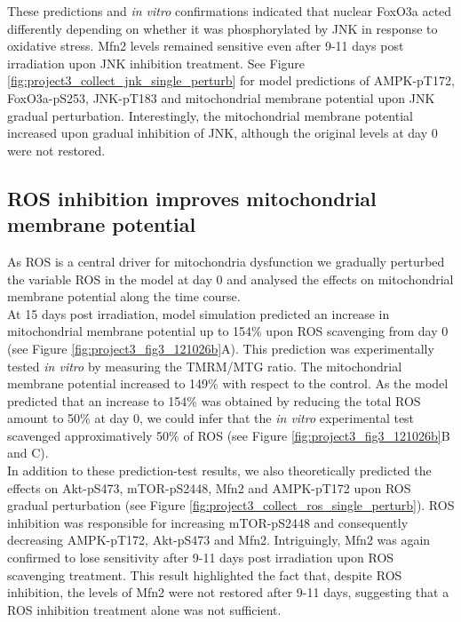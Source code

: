 These predictions and \emph{in vitro} confirmations indicated that nuclear FoxO3a acted differently depending on whether it was phosphorylated by JNK in response to oxidative stress. Mfn2 levels remained sensitive even after 9-11 days post irradiation upon JNK inhibition treatment. See Figure \ref{fig:project3_collect_jnk_single_perturb} for model predictions of AMPK-pT172, FoxO3a-pS253, JNK-pT183 and mitochondrial membrane potential upon JNK gradual perturbation. Interestingly, the mitochondrial membrane potential increased upon gradual inhibition of JNK, although the original levels at day 0 were not restored.


\subsection{ROS inhibition improves mitochondrial membrane potential}
\label{project3-subsec:ROS inhibition improves mitochondrial membrane potential}
As ROS is a central driver for mitochondria dysfunction we gradually perturbed the variable ROS in the model at day 0 and analysed the effects on mitochondrial membrane potential along the time course.\\
At 15 days post irradiation, model simulation predicted an increase in mitochondrial membrane potential up to 154\% upon ROS scavenging from day 0 (see Figure \ref{fig:project3_fig3_121026b}A). This prediction was experimentally tested \emph{in vitro} by measuring the TMRM/MTG ratio. The mitochondrial membrane potential increased to 149\% with respect to the control. As the model predicted that an increase to 154\% was obtained by reducing the total ROS amount to 50\% at day 0, we could infer that the \emph{in vitro} experimental test scavenged approximatively 50\% of ROS (see Figure \ref{fig:project3_fig3_121026b}B and C).\\
In addition to these prediction-test results, we also theoretically predicted the effects on Akt-pS473, mTOR-pS2448, Mfn2 and AMPK-pT172 upon ROS gradual perturbation (see Figure \ref{fig:project3_collect_ros_single_perturb}). ROS inhibition was responsible for increasing mTOR-pS2448 and consequently decreasing AMPK-pT172, Akt-pS473 and Mfn2. Intriguingly, Mfn2 was again confirmed to lose sensitivity after 9-11 days post irradiation upon ROS scavenging treatment. This result highlighted the fact that, despite ROS inhibition, the levels of Mfn2 were not restored after 9-11 days, suggesting that a ROS inhibition treatment alone was not sufficient.



